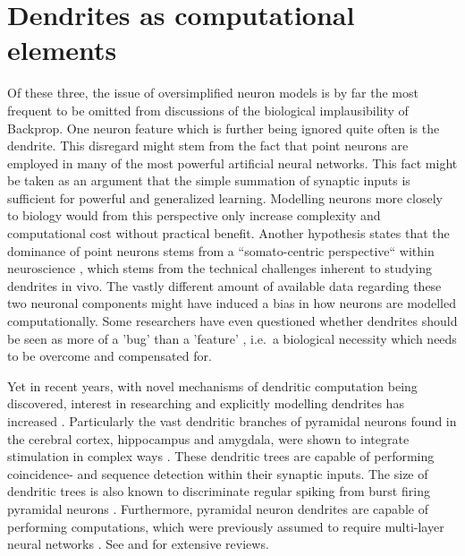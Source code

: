 \section{Dendrites as computational elements}\label{sec-dendrites}

Of these three, the issue of oversimplified neuron models is by far the most frequent to be omitted from discussions of
the biological implausibility of Backprop. One neuron feature which is further being ignored quite often is the
dendrite. This disregard might stem from the fact that point neurons are employed in many of the most powerful
artificial neural networks. This fact might be taken as an argument that the simple summation of synaptic inputs is
sufficient for powerful and generalized learning. Modelling neurons more closely to biology would from this perspective
only increase complexity and computational cost without practical benefit. Another hypothesis states that the dominance
of point neurons stems from a ``somato-centric perspective`` within neuroscience \citep{Larkum2018}, which stems from
the technical challenges inherent to studying dendrites in vivo. The vastly different amount of available data regarding
these two neuronal components might have induced a bias in how neurons are modelled computationally. Some researchers
have even questioned whether dendrites should be seen as more of a 'bug' than a 'feature' \citep{Haeusser2003}, i.e.\ a
biological necessity which needs to be overcome and compensated for.

Yet in recent years, with novel mechanisms of dendritic computation being discovered, interest in researching and
explicitly modelling dendrites has increased \citep{Richards2019,guerguiev2017towards}. Particularly the vast dendritic
branches of pyramidal neurons found in the cerebral cortex, hippocampus and amygdala, were shown to integrate
stimulation in complex ways \citep{spruston2008pyramidal}. These dendritic trees are capable of performing coincidence-
\citep{Larkum1999} and sequence detection \citep{Branco2010} within their synaptic inputs. The size of dendritic trees
is also known to discriminate regular spiking from burst firing pyramidal neurons \citep{Elburg2010}. Furthermore,
pyramidal neuron dendrites are capable of performing computations, which were previously assumed to require multi-layer
neural networks \citep{Schiess2016,Gidon2020}. See \citep{Larkum2022} and \citep{Poirazi2020} for extensive reviews.


